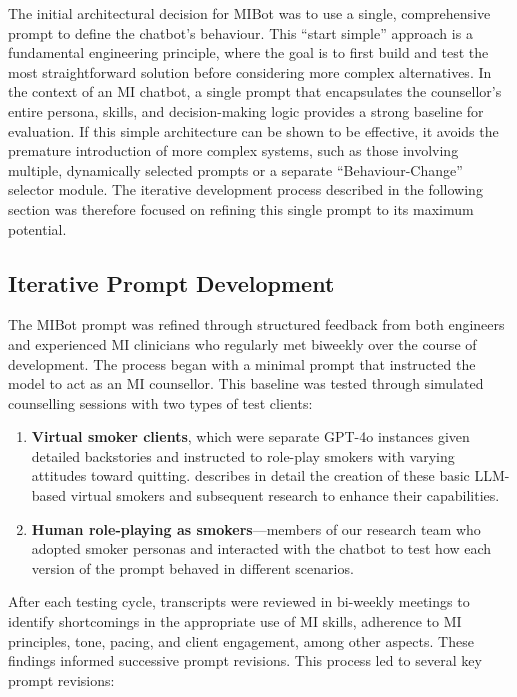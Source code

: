 The initial architectural decision for MIBot was to use a single, comprehensive prompt
to define the chatbot's behaviour. This ``start simple'' approach is a fundamental
engineering principle, where the goal is to first build and test the most
straightforward solution before considering more complex alternatives. In the context
of an MI chatbot, a single prompt that encapsulates the counsellor's entire persona,
skills, and decision-making logic provides a strong baseline for evaluation. If this
simple architecture can be shown to be effective, it avoids the premature introduction
of more complex systems, such as those involving multiple, dynamically selected prompts
or a separate ``Behaviour-Change'' selector module. The iterative development process
described in the following section was therefore focused on refining this single prompt
to its maximum potential.

\subsection{Iterative Prompt Development}
The MIBot prompt was refined through structured feedback from both engineers and
experienced MI clinicians who regularly met biweekly over the course of development.
The process began with a minimal prompt that instructed the model to act as an MI
counsellor. This baseline was tested through simulated counselling sessions with two
types of test clients:

\begin{enumerate}
	\item \textbf{Virtual smoker clients}, which were separate GPT-4o instances given detailed backstories and instructed to role-play smokers with varying attitudes toward quitting.  describes in detail the creation of these basic LLM-based virtual smokers and subsequent research to enhance their capabilities.
	\item \textbf{Human role-playing as smokers}---members of our research team who adopted smoker personas and interacted with the chatbot to test how each version of the prompt behaved in different scenarios.
\end{enumerate}

After each testing cycle, transcripts were reviewed in bi-weekly meetings to identify
shortcomings in the appropriate use of MI skills, adherence to MI principles, tone,
pacing, and client engagement, among other aspects. These findings informed successive
prompt revisions. This process led to several key prompt revisions:

